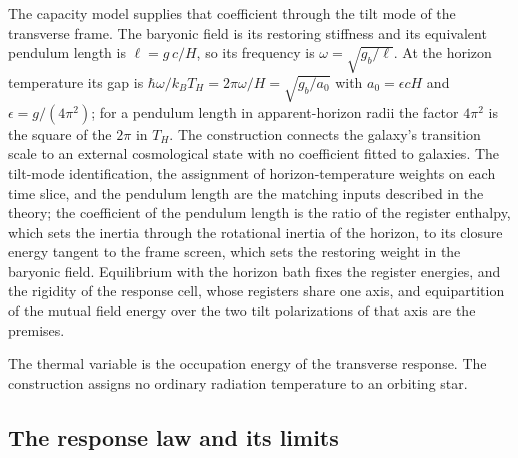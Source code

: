 The capacity model supplies that coefficient through the tilt mode of the
transverse frame. The baryonic field is its restoring stiffness and its
equivalent pendulum length is $\ell=g\,c/H$, so its frequency is $\omega=\sqrt{g_b/\ell}$.
At the horizon temperature its gap is
$\hbar\omega/k_BT_H=2\pi\omega/H=\sqrt{g_b/a_0}$ with $a_0=\epsilon cH$ and
$\epsilon=g/(4\pi^2)$; for a pendulum length in apparent-horizon radii the factor
$4\pi^2$ is the square of the $2\pi$ in $T_H$.
The construction connects the galaxy's transition scale to an external
cosmological state with no coefficient fitted to galaxies. The tilt-mode identification, the assignment of horizon-temperature weights on each time slice, and the pendulum length are the matching inputs described in the theory; the coefficient of the pendulum length is the ratio of the register enthalpy, which sets the inertia through the
rotational inertia of the horizon, to its closure energy tangent to the frame
screen, which sets the restoring weight in the baryonic field. Equilibrium with the horizon bath fixes the register energies, and the rigidity of the response cell, whose registers share one axis, and equipartition of the mutual field energy over the two tilt polarizations of that axis are the premises. 

The thermal variable is the occupation energy of the transverse response.
The construction assigns no ordinary radiation temperature to an orbiting star.

\subsection{The response law and its limits}

